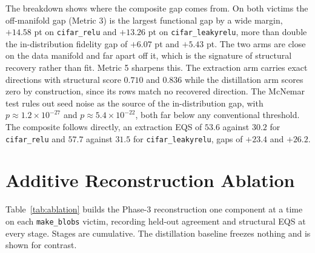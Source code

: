 \documentclass[runningheads,orivec]{llncs}
\begin{document}
The breakdown shows where the composite gap comes from. On both victims the off-manifold gap (Metric 3) is the largest functional gap by a wide margin, $+14.58$ pt on \texttt{cifar\_relu} and $+13.26$ pt on \texttt{cifar\_leakyrelu}, more than double the in-distribution fidelity gap of $+6.07$ pt and $+5.43$ pt. The two arms are close on the data manifold and far apart off it, which is the signature of structural recovery
rather than fit. Metric 5 sharpens this. The extraction arm carries exact directions with structural score $0.710$ and $0.836$ while the distillation arm scores zero by construction, since its rows match no recovered direction. The McNemar test rules out seed noise as the source of the in-distribution gap, with $p\approx1.2\times10^{-27}$
and $p\approx5.4\times10^{-22}$, both far below any conventional threshold. The composite follows directly, an extraction EQS of $53.6$ against $30.2$ for \texttt{cifar\_relu} and $57.7$ against $31.5$ for \texttt{cifar\_leakyrelu}, gaps of $+23.4$ and $+26.2$.

\section{Additive Reconstruction Ablation}
\label{app:exp:ablation}
Table~\ref{tab:ablation} builds the Phase-3 reconstruction one component at a time on
each \texttt{make\_blobs} victim, recording held-out agreement and structural EQS at
every stage. Stages are cumulative. The distillation baseline freezes nothing and is
shown for contrast.
\end{document}
